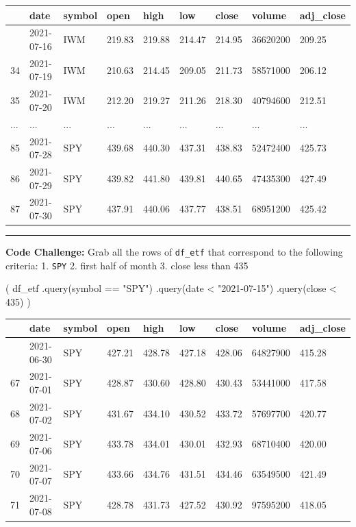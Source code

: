 \documentclass[
  letterpaper,
  DIV=11,
  numbers=noendperiod]{scrreprt}
\newenvironment{Shaded}{\begin{snugshade}}{\end{snugshade}}
\newcommand{\NormalTok}[1]{\textcolor[rgb]{0.00,0.23,0.31}{#1}}
\newcommand{\StringTok}[1]{\textcolor[rgb]{0.13,0.47,0.30}{#1}}
\begin{document}
\begin{longtable}[]{@{}lllllllll@{}}
\toprule\noalign{}
& date & symbol & open & high & low & close & volume & adj\_close \\
\midrule\noalign{}
\endhead
\bottomrule\noalign{}
\endlastfoot
33 & 2021-07-16 & IWM & 219.83 & 219.88 & 214.47 & 214.95 & 36620200 &
209.25 \\
34 & 2021-07-19 & IWM & 210.63 & 214.45 & 209.05 & 211.73 & 58571000 &
206.12 \\
35 & 2021-07-20 & IWM & 212.20 & 219.27 & 211.26 & 218.30 & 40794600 &
212.51 \\
... & ... & ... & ... & ... & ... & ... & ... & ... \\
85 & 2021-07-28 & SPY & 439.68 & 440.30 & 437.31 & 438.83 & 52472400 &
425.73 \\
86 & 2021-07-29 & SPY & 439.82 & 441.80 & 439.81 & 440.65 & 47435300 &
427.49 \\
87 & 2021-07-30 & SPY & 437.91 & 440.06 & 437.77 & 438.51 & 68951200 &
425.42 \\
\end{longtable}

\begin{center}\rule{0.5\linewidth}{0.5pt}\end{center}

\textbf{Code Challenge:} Grab all the rows of \texttt{df\_etf} that
correspond to the following criteria: 1. \texttt{SPY} 2. first half of
month 3. close less than 435

\begin{Shaded}
\begin{Highlighting}[]
\NormalTok{(}
\NormalTok{df\_etf}
\NormalTok{    .query(}\StringTok{\textquotesingle{}symbol == "SPY"\textquotesingle{}}\NormalTok{)}
\NormalTok{    .query(}\StringTok{\textquotesingle{}date \textless{} "2021{-}07{-}15"\textquotesingle{}}\NormalTok{)}
\NormalTok{    .query(}\StringTok{\textquotesingle{}close \textless{} 435\textquotesingle{}}\NormalTok{)}
\NormalTok{)}
\end{Highlighting}
\end{Shaded}

\begin{longtable}[]{@{}lllllllll@{}}
\toprule\noalign{}
& date & symbol & open & high & low & close & volume & adj\_close \\
\midrule\noalign{}
\endhead
\bottomrule\noalign{}
\endlastfoot
66 & 2021-06-30 & SPY & 427.21 & 428.78 & 427.18 & 428.06 & 64827900 &
415.28 \\
67 & 2021-07-01 & SPY & 428.87 & 430.60 & 428.80 & 430.43 & 53441000 &
417.58 \\
68 & 2021-07-02 & SPY & 431.67 & 434.10 & 430.52 & 433.72 & 57697700 &
420.77 \\
69 & 2021-07-06 & SPY & 433.78 & 434.01 & 430.01 & 432.93 & 68710400 &
420.00 \\
70 & 2021-07-07 & SPY & 433.66 & 434.76 & 431.51 & 434.46 & 63549500 &
421.49 \\
71 & 2021-07-08 & SPY & 428.78 & 431.73 & 427.52 & 430.92 & 97595200 &
418.05 \\
\end{longtable}
\end{document}
